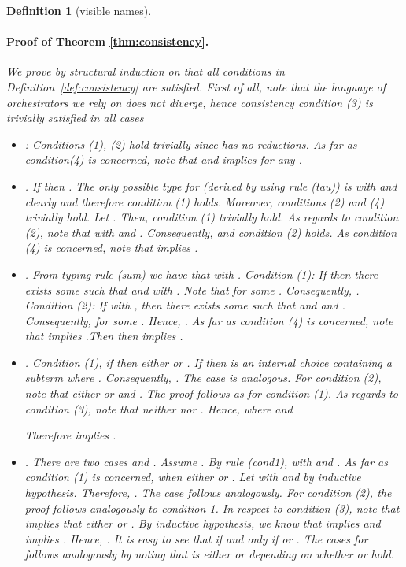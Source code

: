 \documentclass[submission,copyright,creativecommons]{eptcs}
\newtheorem{definition1}{Definition}
\begin{document}
\begin{definition1}[visible names]
\paragraph{Proof of Theorem \ref{thm:consistency}.}
We prove by structural induction on   that all conditions in Definition~\ref{def:consistency} are satisfied.
First of all, note that the language of orchestrators we rely on does not diverge, hence consistency condition (3) is trivially satisfied in all cases
    \begin{itemize}   
      \item : Conditions (1), (2) hold trivially since  has no reductions. As far as condition(4) is concerned, note that  and  implies  for any .  

      \item . If  then . The only possible type for  (derived by using rule {\sc (tau)}) is  with  and clearly  and therefore condition (1) holds. Moreover, conditions (2) and (4) trivially hold. Let . Then, condition (1) trivially hold. As regards to condition (2), note that  with  and
      . Consequently,  and condition (2) holds. As condition (4) is concerned, note that  implies .

      \item . From typing rule {\sc (sum)} we have that  with . Condition (1): If  then there exists some  such that   and  with . Note that  for some . Consequently, 
      . Condition (2): If  with , then there exists some  such that   and  and . Consequently,  for some . Hence, . As far as condition (4) is concerned, note that  implies .Then  then  implies .   
         
      \item . Condition (1), if   then either  or . If  then  is an internal choice containing a subterm   where . Consequently, . The case  is analogous. For condition (2), note that either  or  and . The proof follows as for condition (1). As regards to condition (3), note that neither  nor . Hence, 
 where  and 
       
    Therefore  implies .
    
    \item . There are two cases  and . Assume 
    . By rule {\sc(cond1)},  with  and . As far as condition (1) is concerned,   when either  or .
    Let   with  and  by inductive hypothesis. Therefore,
    . The case  follows analogously. 
    For condition (2), the proof follows analogously to condition 1. In respect to condition (3), note that  implies 
    that either  or . By inductive hypothesis, we know that  implies
     and  implies
    . Hence, . It is easy to see that 
     if and only if  or  .
    The cases for 
     follows analogously by noting that  is either  or  depending on whether  or  hold.
    \end{itemize}


\end{definition1}
\end{document}
